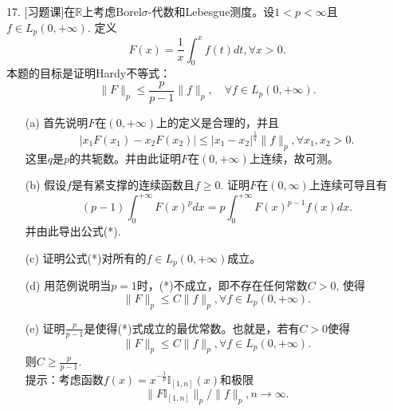 \documentclass[a4paper,8pt]{ctexart}\textwidth 140mm \textheight 216mm
\newcommand{\8}{\infty}
\begin{document}
17. [习题课]在$\mathbb{R}$上考虑Borel$\sigma$-代数和Lebesgue测度。设$1<p<\infty$且$f\in L_p(0,+\infty)$. 定义
$$F(x)=\frac{1}{x}\int_0^x f(t)dt,\forall x>0.$$
本题的目标是证明Hardy不等式：
\begin{equation}\label{3.2}
	\|F\|_p\leq \frac{p}{p-1}\|f\|_p,\quad\forall f\in L_p(0,+\infty).\tag{*}
\end{equation}
\begin{enumerate}
	\item[(a)] 首先说明$F$在$(0,+\infty)$上的定义是合理的，并且
	\begin{equation*}
		|x_1F(x_1)-x_2F(x_2)|\leq |x_1-x_2|^{\frac{1}{q}}\|f\|_p,\forall x_1,x_2>0.
	\end{equation*}
	这里$q$是$p$的共轭数。并由此证明$F$在$(0,+\infty)$上连续，故可测。
	\item[(b)] 假设$f$是有紧支撑的连续函数且$f\geq0$. 证明$F$在$(0,\infty)$上连续可导且有
	\begin{equation*}
		(p-1)\int_0^{+\infty}F(x)^p dx=p\int_0^{+\infty}F(x)^{p-1}f(x)dx.
	\end{equation*}
	并由此导出公式(*).
	\item[(c)] 证明公式(*)对所有的$f\in L_p(0,+\infty)$成立。
	\item[(d)] 用范例说明当$p=1$时，(*)不成立，即不存在任何常数$C>0$, 使得
	\begin{equation*}
		\|F\|_p\leq C\|f\|_p,\forall f\in L_p(0,+\infty).
	\end{equation*}
	\item[(e)] 证明$\frac{p}{p-1}$是使得(*)式成立的最优常数。也就是，若有$C>0$使得
	\begin{equation*}
		  \|F\|_p\leq C\|f\|_p,\forall f\in L_p(0,+\infty).
	\end{equation*}
	则$C\geq\frac{p}{p-1}$.\\
	提示：考虑函数$f(x)=x^{-\frac{1}{p}}\mathbb{I}_{[1,n]}(x)$和极限
	\begin{equation*}
		\|F\mathbb{I}_{[1,n]}\|_p/\|f\|_p,n\to\infty.
	\end{equation*}
\end{enumerate}
\end{document}
